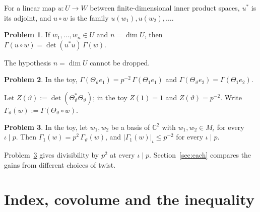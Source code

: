 \documentclass[reqno]{amsart}
\theoremstyle{definition}
\newtheorem{problem}{Problem}[section]
\theoremstyle{plain}
\theoremstyle{remark}
\newcommand{\C}{\mathbb{C}}
\begin{document}
For a linear map \(u\colon U \to W\) between finite-dimensional inner product spaces, \(u^*\) is its adjoint, and \(u \circ w\) is the family \(u(w_1), u(w_2), \dots\).

\begin{problem}\label{pr:gram-comp}
If \(w_1, \dots, w_n \in U\) and \(n = \dim U\), then \(\Gamma(u \circ w) = \det(u^* u)\, \Gamma(w)\).
\end{problem}

The hypothesis \(n = \dim U\) cannot be dropped.

\begin{problem}\label{pr:not-basis}
In the toy, \(\Gamma(\Theta_\vartheta e_1) = p^{-2}\, \Gamma(\Theta_1 e_1)\) and \(\Gamma(\Theta_\vartheta e_2) = \Gamma(\Theta_1 e_2)\).
\end{problem}

Let \(Z(\vartheta) := \det(\Theta_\vartheta^* \Theta_\vartheta)\); in the toy \(Z(1) = 1\) and \(Z(\vartheta) = p^{-2}\).  Write \(\Gamma_\vartheta(w) := \Gamma(\Theta_\vartheta \circ w)\).

\begin{problem}\label{pr:toy-gain}
In the toy, let \(w_1, w_2\) be a basis of \(\C^2\) with \(w_1, w_2 \in M_\iota\) for every \(\iota \mid p\).  Then \(\Gamma_1(w) = p^2\, \Gamma_\vartheta(w)\), and \(\lvert \Gamma_1(w) \rvert_\iota \le p^{-2}\) for every \(\iota \mid p\).
\end{problem}

Problem~\ref{pr:toy-gain} gives divisibility by \(p^2\) at every \(\iota\mid p\).  Section~\ref{sec:each} compares the gains from different choices of twist.

\section{Index, covolume and the inequality}\label{sec:general}
\end{document}
